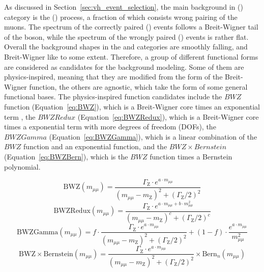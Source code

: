 As discussed in Section~\ref{sec:vh_event_selection}, the main background in \WH (\ZH) category is the \WZ (\ZZ) process, 
a fraction of which consists wrong pairing of the muons.
The \mmm spectrum of the correctly paired \WZ (\ZZ) events follows a Breit-Wigner tail of the \PZ boson, 
while the spectrum of the wrongly paired \WZ (\ZZ) events is rather flat.
Overall the background shapes in the \WH and \ZH categories are smoothly falling, and Breit-Wigner like to some extent.
Therefore, a group of different functional forms are considered as candidates for the background modeling.
Some of them are physics-inspired, meaning that they are modified from the form of the Breit-Wigner function, 
the others are agnostic, which take the form of some general functional bases.
The physics-inspired function candidates include the $BWZ$ function (Equation~\ref{eq:BWZ}), which is a Breit-Wigner core times an exponential term , 
the $BWZRedux$ (Equation~\ref{eq:BWZRedux}), which is a Breit-Wigner core times a exponential term with more degrees of freedom (DOFs),
the $BWZGamma$ (Equation~\ref{eq:BWZGamma}), which is a linear combination of the $BWZ$ function and an exponential function,
and the $BWZ \times Bernstein$ (Equation~\ref{eq:BWZBern}), which is the $BWZ$ function times a Bernstein polynomial. 


\begin{equation}\label{eq:BWZ}
   \mathrm{BWZ}(m_{\mu\mu}) = \frac{\Gamma_{\mathrm{Z}} \cdot e^{a\cdot m_{\mu\mu}}}{(m_{\mu\mu}-m_{\mathrm{Z}})^2+(\Gamma_{\mathrm{Z}}/2)^{2}}
\end{equation}
\begin{equation}\label{eq:BWZRedux}
   \mathrm{BWZRedux}(m_{\mu\mu}) = \frac{\Gamma_{\mathrm{Z}} \cdot e^{a\cdot m_{\mu\mu}+b \cdot m_{\mu\mu}^2}}{(m_{\mu\mu}-m_{\mathrm{Z}})^c+(\Gamma_{\mathrm{Z}}/2)^{c}}
\end{equation}
\begin{equation}\label{eq:BWZGamma}
   \mathrm{BWZGamma}(m_{\mu\mu}) = f \cdot \frac{\Gamma_{\mathrm{Z}} \cdot e^{a\cdot m_{\mu\mu}}}{(m_{\mu\mu}-m_{\mathrm{Z}})^2+(\Gamma_{\mathrm{Z}}/2)^{2}} + (1-f) \cdot \frac{e^{a\cdot m_{\mu\mu}}}{m_{\mu\mu}^2}
\end{equation} 
\begin{equation}\label{eq:BWZBern}
  \mathrm{BWZ\times Bernstein}(m_{\mu\mu}) = \frac{\Gamma_{\mathrm{Z}} \cdot e^{a\cdot m_{\mu\mu}}}{(m_{\mu\mu}-m_{\mathrm{Z}})^2+(\Gamma_{\mathrm{Z}}/2)^{2}} \times \mathrm{Bern}_{n}(m_{\mu\mu})
\end{equation}

